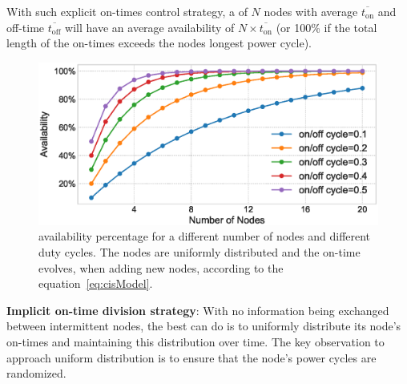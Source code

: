 With such explicit on-times control strategy, a \sys of $N$ nodes with average $\overline{t_\text{on}}$ and off-time $\overline{t_\text{off}}$ will have an average availability of $N\times \overline{t_\text{on}}$ (or 100\% if the total length of the on-times exceeds the nodes longest power cycle).
%
\begin{figure}
		\centering
		\includegraphics[width=\columnwidth]{figures/cisModel}
		\caption{\fullsys availability percentage for a different number of nodes and different duty cycles. The nodes are uniformly distributed and the \sys on-time evolves, when adding new nodes, according to the equation~\ref{eq:cisModel}.}
		\label{fig:cisModel}
\end{figure} 

\noindent\textbf{Implicit on-time division strategy}: 
With no information being exchanged between intermittent nodes, the best \sys can do is to uniformly distribute its node's on-times and maintaining this distribution over time. 
The key observation to approach uniform distribution is to ensure that the node's power cycles are randomized.

